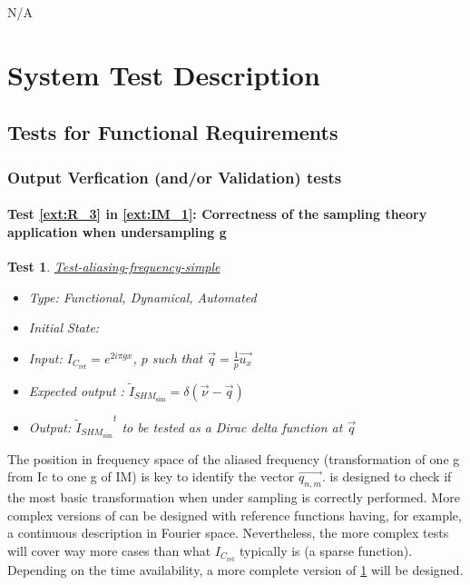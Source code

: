 \documentclass[12pt, titlepage]{article}
\newtheorem{Test}{Test}
\begin{document}
N/A
\section{System Test Description}
	
\subsection{Tests for Functional Requirements}
\renewcommand{\labelitemi}{$\star$}

\subsubsection{Output Verfication (and/or Validation) tests}
	
\paragraph{Test \cref{ext:R_3} in \cref{ext:IM_1}: Correctness of the sampling theory application when undersampling g}

\begin{Test}\normalfont\underline{Test-aliasing-frequency-simple}
\label{aliasing-frequency-simple}
\begin{itemize}
\item Type: Functional, Dynamical, Automated
\item Initial State: 
\item Input: $I_{C_{\text{ref}}}=e^{2i\pi gx}$, $p$ such that $\overrightarrow{q}=\frac{1}{p}\vec{u_x}$
\item Expected output : $\widetilde{I}_{\mathit{SHM}_{\text{sim}}}=\delta(\vec{\nu}-\vec{q})$
\item Output: ${\widetilde{I}_{\mathit{SHM}_{\text{sim}}}}^{t}$ to be tested as a Dirac delta function at $\overrightarrow{q}$
\end{itemize}
\end{Test}
		
The position in frequency space of the aliased frequency (transformation of one g from Ic to one g of IM) is key to identify the vector $\overrightarrow{q_{n,m}}$.  is designed to check if the most basic transformation when under sampling is correctly performed. More complex versions of  can be designed with reference functions having, for example, a continuous description in Fourier space. Nevertheless, the more complex tests will cover way more cases than what $I_{C_{\text{ref}}}$ typically is (a sparse function). Depending on the time availability, a more complete version of \cref{aliasing-frequency-simple} will be designed.
		
\end{document}
